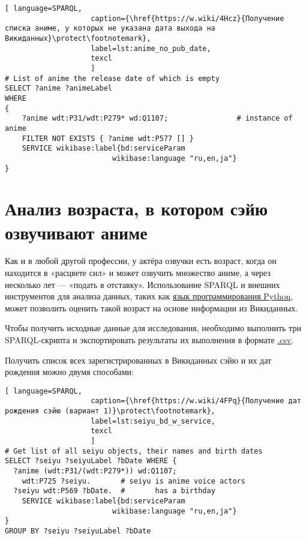 \begin{lstlisting}[ language=SPARQL, 
                    caption={\href{https://w.wiki/4Hcz}{Получение списка аниме, у которых не указана дата выхода на Викиданных}\protect\footnotemark},
                    label=lst:anime_no_pub_date,
                    texcl 
                    ]
# List of anime the release date of which is empty
SELECT ?anime ?animeLabel
WHERE
{
    ?anime wdt:P31/wdt:P279* wd:Q1107;                # instance of anime
    FILTER NOT EXISTS { ?anime wdt:P577 [] }
    SERVICE wikibase:label{bd:serviceParam
					     wikibase:language "ru,en,ja"}
}
\end{lstlisting}%

\section{Анализ возраста, в котором сэйю озвучивают аниме}

Как и в любой другой профессии, у актёра озвучки есть возраст, когда он находится в «расцвете сил» и может озвучить множество аниме, а через несколько лет — «подать в отставку». Использование SPARQL и внешних инструментов для анализа данных, таких как \href{https://ru.wikipedia.org/wiki/Python}{язык программирования Python}, может позволить оценить такой возраст на основе информации из Викиданных.

Чтобы получить исходные данные для исследования, необходимо выполнить три SPARQL-скрипта и экспортировать результаты их выполнения в формате \href{https://ru.wikipedia.org/wiki/CSV}{.csv}.

Получить список всех зарегистрированных в Викиданных сэйю и их дат рождения можно двумя способами: 

\begin{lstlisting}[ language=SPARQL, 
                    caption={\href{https://w.wiki/4FPq}{Получение дат рождения сэйю (вариант 1)}\protect\footnotemark},
                    label=lst:seiyu_bd_w_service,
                    texcl 
                    ]
# Get list of all seiyu objects, their names and birth dates
SELECT ?seiyu ?seiyuLabel ?bDate WHERE {
  ?anime (wdt:P31/(wdt:P279*)) wd:Q1107;
    wdt:P725 ?seiyu.       # seiyu is anime voice actors
  ?seiyu wdt:P569 ?bDate.  #       has a birthday
    SERVICE wikibase:label{bd:serviceParam
					     wikibase:language "ru,en,ja"}
}
GROUP BY ?seiyu ?seiyuLabel ?bDate
\end{lstlisting}%

